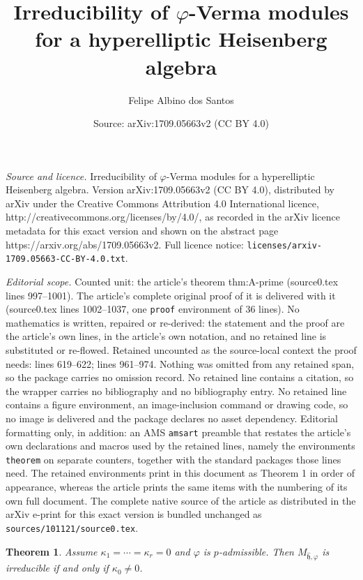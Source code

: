 \documentclass[10pt,a4paper]{amsart}
\title{Irreducibility of \texorpdfstring{$\varphi$}{phi}-Verma modules for a hyperelliptic Heisenberg algebra}
\author{Felipe Albino dos Santos}
\date{Source: arXiv:1709.05663v2 (CC BY 4.0)}
\newtheorem{theorem}{Theorem}
\newcommand{\h}{\mathfrak{h}}
\newcommand{\wh}[1]{\widehat{#1}}
\newcommand{\whh}{\wh{\h}}
\begin{document}
\maketitle

\noindent\emph{Source and licence.} Irreducibility of \texorpdfstring{$\varphi$}{phi}-Verma modules for a hyperelliptic Heisenberg algebra. Version arXiv:1709.05663v2 (CC BY 4.0), distributed by arXiv under the Creative Commons Attribution 4.0 International licence, http://creativecommons.org/licenses/by/4.0/, as recorded in the arXiv licence metadata for this exact version and shown on the abstract page https://arxiv.org/abs/1709.05663v2. Full licence notice: \texttt{licenses/arxiv-1709.05663-CC-BY-4.0.txt}.\par\smallskip

\noindent\textit{Editorial scope.} Counted unit: the article's theorem thm:A-prime (source0.tex lines 997--1001). The article's complete original proof of it is delivered with it (source0.tex lines 1002--1037, one \texttt{proof} environment of 36 lines). No mathematics is written, repaired or re-derived: the statement and the proof are the article's own lines, in the article's own notation, and no retained line is substituted or re-flowed.  Retained uncounted as the source-local context the proof needs: lines 619--622; lines 961--974.  Nothing was omitted from any retained span, so the package carries no omission record.  No retained line contains a citation, so the wrapper carries no bibliography and no bibliography entry.  No retained line contains a figure environment, an image-inclusion command or drawing code, so no image is delivered and the package declares no asset dependency.  Editorial formatting only, in addition: an AMS \texttt{amsart} preamble that restates the article's own declarations and macros used by the retained lines, namely the environments \texttt{theorem} on separate counters, together with the standard packages those lines need.  The retained environments print in this document as Theorem 1 in order of appearance, whereas the article prints the same items with the numbering of its own full document.  The complete native source of the article as distributed in the arXiv e-print for this exact version is bundled unchanged as \texttt{sources/101121/source0.tex}.
\begin{theorem}\label{thm:A}
Assume $\kappa_1=\cdots=\kappa_r=0$ and $\varphi$ is $p$-admissible.
Then $M_{\whh,\varphi}$ is irreducible if and only if $\kappa_0\neq0$.
\end{theorem}
\end{document}
